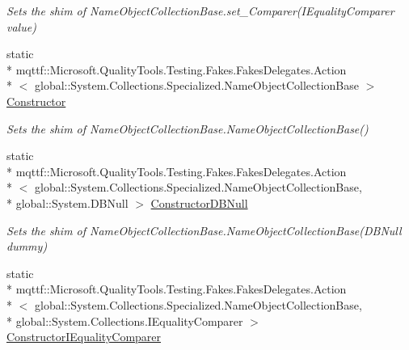 \begin{DoxyCompactItemize}
\begin{DoxyCompactList}\small\item\em Sets the shim of Name\-Object\-Collection\-Base.\-set\-\_\-\-Comparer(\-I\-Equality\-Comparer value)\end{DoxyCompactList}\item 
static \\*
mqttf\-::\-Microsoft.\-Quality\-Tools.\-Testing.\-Fakes.\-Fakes\-Delegates.\-Action\\*
$<$ global\-::\-System.\-Collections.\-Specialized.\-Name\-Object\-Collection\-Base $>$ \hyperlink{class_system_1_1_collections_1_1_specialized_1_1_fakes_1_1_shim_name_object_collection_base_a5d9ca8bb40d564277df86c31f2436e3f}{Constructor}
\begin{DoxyCompactList}\small\item\em Sets the shim of Name\-Object\-Collection\-Base.\-Name\-Object\-Collection\-Base()\end{DoxyCompactList}\item 
static \\*
mqttf\-::\-Microsoft.\-Quality\-Tools.\-Testing.\-Fakes.\-Fakes\-Delegates.\-Action\\*
$<$ global\-::\-System.\-Collections.\-Specialized.\-Name\-Object\-Collection\-Base, \\*
global\-::\-System.\-D\-B\-Null $>$ \hyperlink{class_system_1_1_collections_1_1_specialized_1_1_fakes_1_1_shim_name_object_collection_base_a4f7a813f59ef983732490861771be42f}{Constructor\-D\-B\-Null}
\begin{DoxyCompactList}\small\item\em Sets the shim of Name\-Object\-Collection\-Base.\-Name\-Object\-Collection\-Base(\-D\-B\-Null dummy)\end{DoxyCompactList}\item 
static \\*
mqttf\-::\-Microsoft.\-Quality\-Tools.\-Testing.\-Fakes.\-Fakes\-Delegates.\-Action\\*
$<$ global\-::\-System.\-Collections.\-Specialized.\-Name\-Object\-Collection\-Base, \\*
global\-::\-System.\-Collections.\-I\-Equality\-Comparer $>$ \hyperlink{class_system_1_1_collections_1_1_specialized_1_1_fakes_1_1_shim_name_object_collection_base_ab8e0f3d7fdc3387f1640479a20383967}{Constructor\-I\-Equality\-Comparer}

\end{DoxyCompactItemize}
